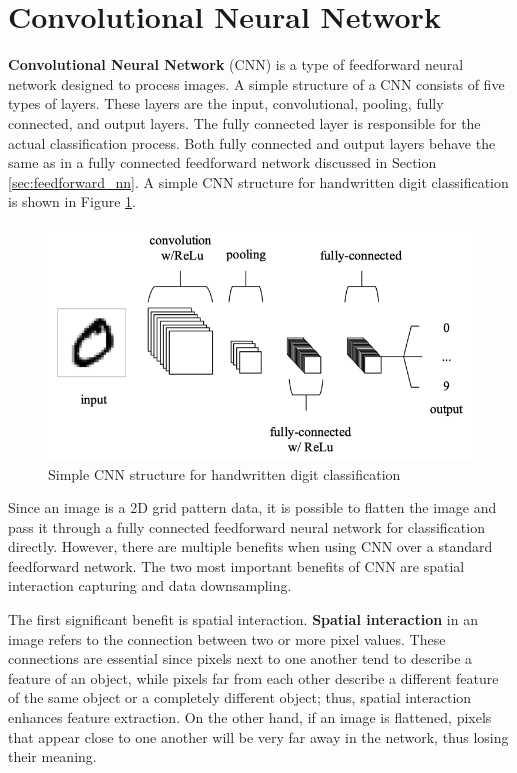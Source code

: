\section{Convolutional Neural Network} \label{sec:cnn}

\textbf{Convolutional Neural Network} (CNN) is a type of feedforward neural network designed to process images. A simple structure of a CNN consists of five types of layers. These layers are the input, convolutional, pooling, fully connected, and output layers. The fully connected layer is responsible for the actual classification process. Both fully connected and output layers behave the same as in a fully connected feedforward network discussed in Section \ref{sec:feedforward_nn}. A simple CNN structure for handwritten digit classification is shown in Figure \ref{fig:simple_cnn_diagram}.

\begin{figure}[!ht]
    \centering
    \includegraphics[width=4.5in]{figures/simple_cnn.png}
    \caption{Simple CNN structure for handwritten digit classification \cite{o2015introduction}}
    \label{fig:simple_cnn_diagram}
\end{figure}

Since an image is a 2D grid pattern data, it is possible to flatten the image and pass it through a fully connected feedforward neural network for classification directly. However, there are multiple benefits when using CNN over a standard feedforward network. The two most important benefits of CNN are spatial interaction capturing and data downsampling.

The first significant benefit is spatial interaction. \textbf{Spatial interaction} in an image refers to the connection between two or more pixel values. These connections are essential since pixels next to one another tend to describe a feature of an object, while pixels far from each other describe a different feature of the same object or a completely different object; thus, spatial interaction enhances feature extraction. On the other hand, if an image is flattened, pixels that appear close to one another will be very far away in the network, thus losing their meaning.

